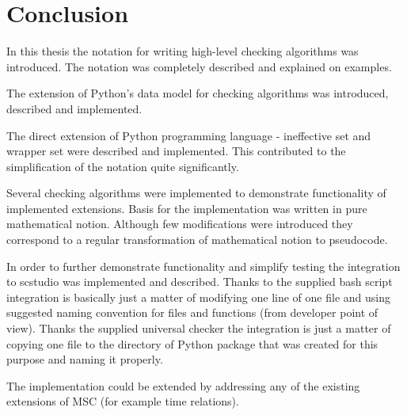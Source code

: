 \documentclass[11pt,oneside]{fithesis2}
\begin{document}
\chapter{Conclusion}
In this thesis the notation for writing high-level checking algorithms was introduced. The notation was completely described and explained on examples.

The extension of Python's data model for checking algorithms was introduced, described and implemented.

The direct extension of Python programming language - ineffective set and wrapper set were described and implemented. This contributed to the simplification of the notation quite significantly.

Several checking algorithms were implemented to demonstrate functionality of implemented extensions. Basis for the implementation was written in pure mathematical notion. Although few modifications were introduced they correspond to a regular transformation of mathematical notion to pseudocode.

In order to further demonstrate functionality and simplify testing the integration to scstudio was implemented and described. Thanks to the supplied bash script integration is basically just a matter of modifying one line of one file and using suggested naming convention for files and functions (from developer point of view). Thanks the supplied universal checker the integration is just a matter of copying one file to the directory of Python package that was created for this purpose and naming it properly.

The implementation could be extended by addressing any of the existing extensions of MSC (for example time relations).

\printbibliography
 
\end{document}

